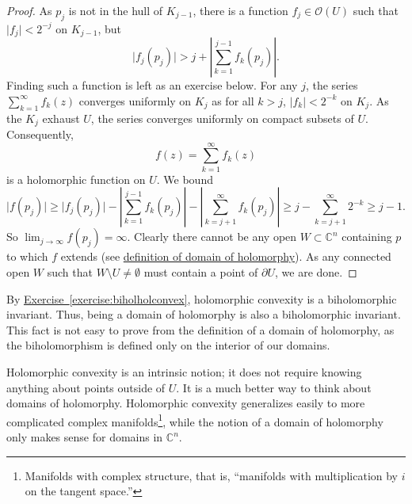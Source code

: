 \documentclass[12pt,openany]{book}
\newcommand{\sabs}[1]{\lvert {#1} \rvert}
\newcommand{\abs}[1]{\left\lvert {#1} \right\rvert}
\newcommand{\C}{{\mathbb{C}}}
\newcommand{\sO}{{\mathscr{O}}}
\theoremstyle{plain}
\theoremstyle{remark}
\theoremstyle{definition}
\theoremstyle{exercise}
\theoremstyle{example}
\newcommand{\exerciseref}[1]{\hyperref[#1]{Exercise~\ref*{#1}}}
\begin{document}
\begin{proof}
As $p_j$ is not in the hull of $K_{j-1}$, there is a function $f_j \in
\sO(U)$ such that $\sabs{f_j} < 2^{-j}$ on $K_{j-1}$, but
\begin{equation*}
\sabs{f_j(p_j)} > j + \abs{\sum_{k=1}^{j-1} f_k(p_j)} .
\end{equation*}
Finding such a function is left as an exercise below.
For any $j$, the series $\sum_{k=1}^\infty f_k(z)$ converges uniformly on $K_j$
as for all $k > j$, $\sabs{f_k} < 2^{-k}$ on $K_j$.
As the $K_j$ exhaust $U$, the series converges uniformly on compact
subsets of $U$.  Consequently,
\begin{equation*}
f(z) = \sum_{k=1}^\infty f_k(z)
\end{equation*}
is a holomorphic function on $U$.  We bound
\begin{equation*}
\sabs{f(p_j)} \geq
\sabs{f_j(p_j)}
-
\abs{\sum_{k=1}^{j-1} f_k(p_j)}
-
\abs{\sum_{k=j+1}^\infty f_k(p_j)}
\geq
j
-
\sum_{k=j+1}^\infty 2^{-k}
\geq j-1 .
\end{equation*}
So $\lim_{j\to\infty} f(p_j) = \infty$.
Clearly there cannot be any open $W \subset \C^n$
containing $p$ to which $f$ extends (see
\hyperref[defn:domainofhol]{definition of domain of holomorphy}).  As any
connected open $W$ such that $W \setminus U \not= \emptyset$ must contain a
point of $\partial U$, we are done.
\end{proof}

By \exerciseref{exercise:biholholconvex},
holomorphic convexity is a biholomorphic invariant.
Thus,
being a domain of holomorphy is also a biholomorphic invariant.  This
fact is not easy to prove from the definition of a domain of
holomorphy, as the
biholomorphism is defined only on the interior of our domains.

Holomorphic convexity is an intrinsic notion; it does not require
knowing anything about points outside of $U$.  It is a much
better way to think about domains of holomorphy.  Holomorphic
convexity generalizes easily to more complicated complex
manifolds\footnote{Manifolds with complex structure, that is, ``manifolds
with multiplication by $i$ on the tangent space.''}, while
the notion of a domain of holomorphy only makes sense for domains in $\C^n$.
\end{document}
